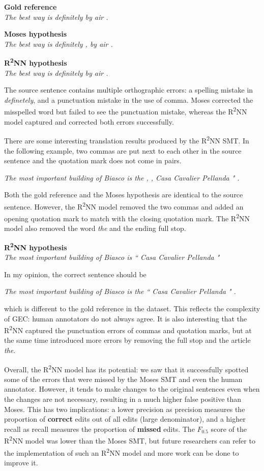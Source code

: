 \documentclass[12pt,a4paper,twoside,openright]{report}
\begin{document}
\textbf{Gold reference}\\
\textit{The best way is definitely by air .}

\textbf{Moses hypothesis}\\
\textit{The best way is definitely , by air . }

\textbf{R\textsuperscript{2}NN hypothesis}\\
\textit{The best way is definitely by air .}

The source sentence contains multiple orthographic errors: a spelling mistake in \textit{definetely}, and a punctuation mistake in the use of comma. Moses corrected the misspelled word but failed to see the punctuation mistake, whereas the R\textsuperscript{2}NN model captured and corrected both errors successfully.

There are some interesting translation results produced by the R\textsuperscript{2}NN SMT. In the following example, two commas are put next to each other in the source sentence and the quotation mark does not come in pairs.

\begin{center}
    \textit{The most important building of Biasco is the , , Casa Cavalier Pellanda " .}
\end{center}

Both the gold reference and the Moses hypothesis are identical to the source sentence. However, the R\textsuperscript{2}NN model removed the two commas and added an opening quotation mark to match with the closing quotation mark. The R\textsuperscript{2}NN model also removed the word \textit{the} and the ending full stop. 

\textbf{R\textsuperscript{2}NN hypothesis}\\
\textit{The most important building of Biasco is `` Casa Cavalier Pellanda "}

In my opinion, the correct sentence should be
\begin{center}
    \textit{The most important building of Biasco is the `` Casa Cavalier Pellanda " .}
\end{center}
which is different to the gold reference in the dataset. This reflects the complexity of GEC: human annotators do not always agree. It is also interesting that the R\textsuperscript{2}NN captured the punctuation errors of commas and quotation marks, but at the same time introduced more errors by removing the full stop and the article \textit{the}. 

Overall, the R\textsuperscript{2}NN model has its potential: we saw that it successfully spotted some of the errors that were missed by the Moses SMT and even the human annotator. However, it tends to make changes to the original sentences even when the changes are not necessary, resulting in a much higher false positive than Moses. This has two implications: a lower precision as precision measures the proportion of \textbf{correct} edits out of all edits (large denominator), and a higher recall as recall measures the proportion of \textbf{missed} edits. The $F_{0.5}$ score of the R\textsuperscript{2}NN model was lower than the Moses SMT, but future researchers can refer to the implementation of such an R\textsuperscript{2}NN model and more work can be done to improve it.
\end{document}
